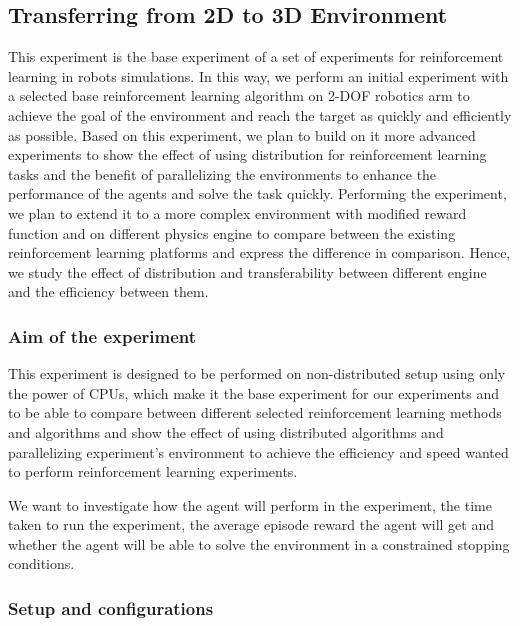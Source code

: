 
\subsection{Transferring from 2D to 3D Environment}

This experiment is the base experiment of a set of experiments for reinforcement learning in robots simulations.
In this way, we perform an initial experiment with a selected base reinforcement learning algorithm on 2-DOF robotics arm to achieve the goal of the environment and reach the target as quickly and efficiently as possible.
Based on this experiment, we plan to build on it more advanced experiments to show the effect of using distribution for reinforcement learning tasks and the benefit of parallelizing the environments to enhance the performance of the agents and solve the task quickly. Performing the experiment, we plan to extend it to a more complex environment with modified reward function and on different physics engine to compare between the existing reinforcement learning platforms and express the difference in comparison. Hence, we study the effect of distribution and transferability between different engine and the efficiency between them.

\subsubsection{Aim of the experiment}

This experiment is designed to be performed on non-distributed setup using only the power of CPUs, which make it the base experiment for our experiments and to be able to compare between different selected reinforcement learning methods and algorithms and show the effect of using distributed algorithms and parallelizing experiment's environment to achieve the efficiency and speed wanted to perform reinforcement learning experiments. 

We want to investigate how the agent will perform in the experiment, the time taken to run the experiment, the average episode reward the agent will get and whether the agent will be able to solve the environment in a constrained stopping conditions.

\subsubsection{Setup and configurations}


